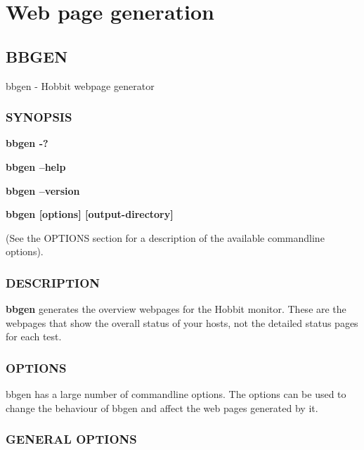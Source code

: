 %
\chapter{Web page generation}

%
\section{BBGEN}

 bbgen - Hobbit webpage generator \subsection{SYNOPSIS}
\textbf{bbgen -?}
 
\textbf{bbgen --help}
 
\textbf{bbgen --version}
 
\textbf{bbgen [options] [output-directory]}
 
 (See the OPTIONS section for a description of the available commandline options). 

 
\subsection{DESCRIPTION}
\textbf{bbgen}
 generates the overview webpages for the Hobbit monitor. These are the
 webpages that show the overall status of your hosts, not the detailed
 status pages for each test. 


 
\subsection{OPTIONS}
 bbgen has a large number of commandline options. The options can be
 used to change the behaviour of bbgen and affect the web pages
 generated by it. 


 
\subsection{GENERAL OPTIONS}


